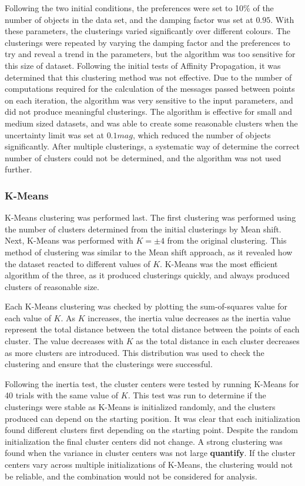 Following the two initial conditions, the preferences were set to 10\% of the number of objects in the data set, and the damping factor was set at $0.95$.
With these parameters, the clusterings varied significantly over different colours.
The clusterings were repeated by varying the damping factor and the preferences to try and reveal a trend in the parameters, but the algorithm was too sensitive for this size of dataset.
Following the initial tests of Affinity Propagation, it was determined that this clustering method was not effective.
Due to the number of computations required for the calculation of the messages passed between points on each iteration, the algorithm was very sensitive to the input parameters, and did not produce meaningful clusterings.
The algorithm is effective for small and medium sized datasets, and was able to create some reasonable clusters when the uncertainty limit was set at $0.1 mag$, which reduced the number of objects significantly. 
After multiple clusterings, a systematic way of determine the correct number of clusters could not be determined, and the algorithm was not used further.

\subsubsection{K-Means}
K-Means clustering was performed last.
The first clustering was performed using the number of clusters determined from the initial clusterings by Mean shift.
Next, K-Means was performed with $K = \pm 4$ from the original clustering.
This method of clustering was similar to the Mean shift approach, as it revealed how the dataset reacted to different values of $K$.
K-Means was the most efficient algorithm of the three, as it produced clusterings quickly, and always produced clusters of reasonable size.

Each K-Means clustering was checked by plotting the sum-of-squares value for each value of $K$.
As $K$ increases, the inertia value decreases as the inertia value represent the total distance between the total distance between the points of each cluster.
The value decreases with $K$ as the total distance in each cluster decreases as more clusters are introduced.
This distribution was used to check the clustering and ensure that the clusterings were successful.

Following the inertia test, the cluster centers were tested by running K-Means for 40 trials with the same value of $K$.
This test was run to determine if the clusterings were stable as K-Means is initialized randomly, and the clusters produced can depend on the starting position.
It was clear that each initialization found different clusters first depending on the starting point. 
Despite the random initialization the final cluster centers did not change.
A strong clustering was found when the variance in cluster centers was not large \textbf{quantify}.
If the cluster centers vary across multiple initializations of K-Means, the clustering would not be reliable, and the combination would not be considered for analysis.

